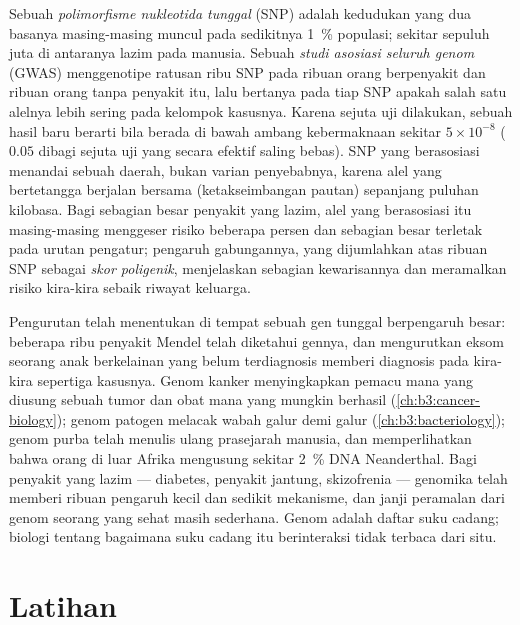 \begin{definition}\label{def:b3:genomics:gwas}
%
Sebuah \emph{polimorfisme nukleotida tunggal} (SNP) adalah kedudukan yang dua
basanya masing-masing muncul pada sedikitnya \qty{1}{\%} populasi; sekitar
sepuluh juta di antaranya lazim pada manusia. Sebuah \emph{studi asosiasi
seluruh genom} (GWAS) menggenotipe ratusan ribu SNP pada ribuan orang
berpenyakit dan ribuan orang tanpa penyakit itu, lalu bertanya pada tiap SNP
apakah salah satu alelnya lebih sering pada kelompok kasusnya. Karena sejuta
uji dilakukan, sebuah hasil baru berarti bila berada di bawah ambang kebermaknaan
sekitar $5\times 10^{-8}$ ($0.05$ dibagi sejuta uji yang secara efektif saling
bebas). SNP yang berasosiasi menandai sebuah daerah, bukan varian
penyebabnya, karena alel yang bertetangga berjalan bersama (ketakseimbangan
pautan) sepanjang puluhan kilobasa. Bagi sebagian besar penyakit yang lazim,
alel yang berasosiasi itu masing-masing menggeser risiko beberapa persen dan
sebagian besar terletak pada urutan pengatur; pengaruh gabungannya, yang
dijumlahkan atas ribuan SNP sebagai \emph{skor poligenik}, menjelaskan
sebagian kewarisannya dan meramalkan risiko kira-kira sebaik riwayat keluarga.
\end{definition}

\begin{remark}\label{rem:b3:genomics:delivered}
Pengurutan telah menentukan di tempat sebuah gen tunggal berpengaruh besar:
beberapa ribu penyakit Mendel telah diketahui gennya, dan mengurutkan eksom
seorang anak berkelainan yang belum terdiagnosis memberi diagnosis pada
kira-kira sepertiga kasusnya. Genom kanker menyingkapkan pemacu mana yang
diusung sebuah tumor dan obat mana yang mungkin berhasil
(\cref{ch:b3:cancer-biology}); genom patogen melacak wabah galur demi galur
(\cref{ch:b3:bacteriology}); genom purba telah menulis ulang prasejarah
manusia, dan memperlihatkan bahwa orang di luar Afrika mengusung sekitar
\qty{2}{\%} DNA Neanderthal. Bagi penyakit yang lazim --- diabetes, penyakit
jantung, skizofrenia --- genomika telah memberi ribuan pengaruh kecil dan
sedikit mekanisme, dan janji peramalan dari genom seorang yang sehat masih
sederhana. Genom adalah daftar suku cadang; biologi tentang bagaimana suku
cadang itu berinteraksi tidak terbaca dari situ.
\end{remark}

\section{Latihan}

